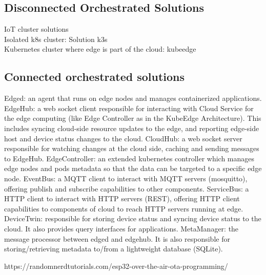 \subsection{Disconnected Orchestrated Solutions}
IoT cluster solutions\\
Isolated k8s cluster: Solution k3s\\
Kubernetes cluster where edge is part of the cloud: kubeedge\\



\subsection{Connected orchestrated solutions}
Edged: an agent that runs on edge nodes and manages containerized applications.
EdgeHub: a web socket client responsible for interacting with Cloud Service for the edge computing (like Edge Controller as in the KubeEdge Architecture). This includes syncing cloud-side resource updates to the edge, and reporting edge-side host and device status changes to the cloud.
CloudHub: a web socket server responsible for watching changes at the cloud side, caching and sending messages to EdgeHub.
EdgeController: an extended kubernetes controller which manages edge nodes and pods metadata so that the data can be targeted to a specific edge node.
EventBus: a MQTT client to interact with MQTT servers (mosquitto), offering publish and subscribe capabilities to other components.
ServiceBus: a HTTP client to interact with HTTP servers (REST), offering HTTP client capabilities to components of cloud to reach HTTP servers running at edge.
DeviceTwin: responsible for storing device status and syncing device status to the cloud. It also provides query interfaces for applications.
MetaManager: the message processor between edged and edgehub. It is also responsible for storing/retrieving metadata to/from a lightweight database (SQLite).

https://randomnerdtutorials.com/esp32-over-the-air-ota-programming/